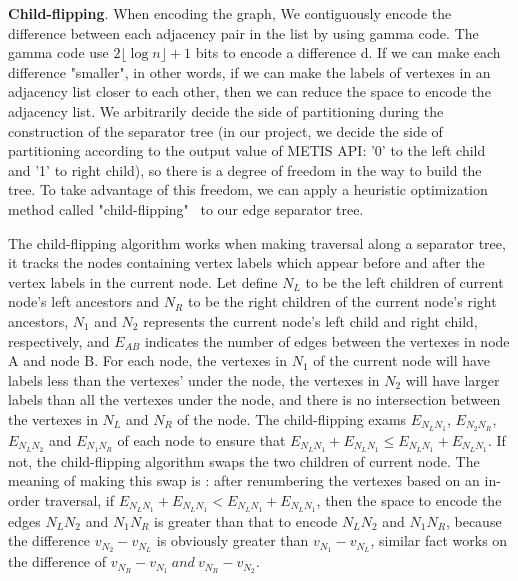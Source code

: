 \documentclass[12pt,glossary]{dalthesis}
\begin{document}
\textbf{Child-flipping}. When encoding the graph, We contiguously encode the difference between each adjacency pair in the list by using gamma code. The gamma code use $2\lfloor \log n \rfloor + 1$ bits to encode a difference d. If we can make each difference "smaller", in other words, if we can make the labels of vertexes in an adjacency list closer to each other, then we can reduce the space to encode the adjacency list. We arbitrarily decide the side of partitioning during the construction of the separator tree (in our project, we decide the side of partitioning according to the output value of METIS API: '0' to the left child and '1' to right child), so there is a degree of freedom in the way to build the tree. To take advantage of this freedom, we can apply a heuristic optimization method called "child-flipping"~\cite{compact-representation} to our edge separator tree.

The child-flipping algorithm works when making traversal along a separator tree, it tracks the nodes containing vertex labels which appear before and after the vertex labels in the current node. Let define $N_{L}$ to be the left children of current node's left ancestors and $N_{R}$ to be the right children of the current node's right ancestors, $N_{1}$ and $N_{2}$ represents the current node's left child and right child, respectively, and $E_{AB}$ indicates the number of edges between the vertexes in node A and node B. For each node, the vertexes in $N_{1}$ of the current node will have labels less than the vertexes' under the node, the vertexes in $N_{2}$ will have larger labels than all the vertexes under the node, and there is no intersection between the vertexes in $N_{L}$ and $N_{R}$ of the node. The child-flipping exams $E_{N_{L}N_{1}}$, $E_{N_{2}N_{R}}$, $E_{N_{L}N_{2}}$ and $E_{N_{1}N_{R}}$ of each node to ensure that $E_{N_{L}N_{1}} + E_{N_{L}N_{1}} \leq E_{N_{L}N_{1}} + E_{N_{L}N_{1}}$. If not, the child-flipping algorithm swaps the two children of current node. The meaning of making this swap is : after renumbering the vertexes based on an in-order traversal, if $E_{N_{L}N_{1}} + E_{N_{L}N_{1}} < E_{N_{L}N_{1}} + E_{N_{L}N_{1}}$, then the space to encode the edges $N_{L}N_{2}$ and $N_{1}N_{R}$ is greater than that to encode $N_{L}N_{2}$ and $N_{1}N_{R}$, because the difference $v_{N_{2}} -v_{N_{L}}$ is obviously greater than $v_{N_{1}} - v_{N_{L}}$, similar fact works on the difference of $v_{N_{R}}-v_{N_{1}} \  and \  v_{N_{R}}-v_{N_{2}}$.
\end{document}

